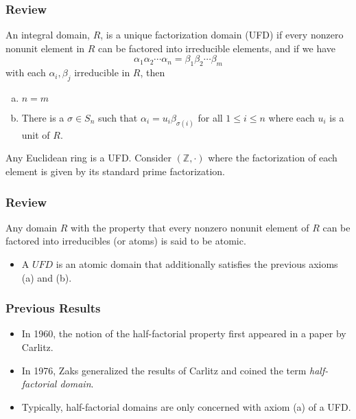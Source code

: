 \begin{frame}
  \frametitle{Review}
  \begin{definition}
    An integral domain, $R$, is a \alert{unique factorization domain (UFD)} if every nonzero nonunit element in $R$ can be factored into irreducible elements, and if we have
    $$ \alpha_1 \alpha_2 \cdots \alpha_n = \beta_1 \beta_2 \cdots \beta_m $$
    with each $\alpha_i, \beta_j$ irreducible in $R$, then
    \begin{enumerate}[(a)]
      \item $n = m$
      \item There is a $\sigma \in S_n$ such that $\alpha_i = u_i \beta_{\sigma(i)}$ for all $1 \leq i \leq n$ where each $u_i$ is a unit of $R$.
    \end{enumerate}
  \end{definition}
\end{frame}
\begin{frame}
  \begin{example}
    Any Euclidean ring is a UFD.
    Consider $(\mathbb{Z}, \cdot)$ where the factorization of each element is given by its standard prime factorization.
  \end{example}
\end{frame}

\begin{frame}
  \frametitle{Review}
  \begin{definition}
    Any domain $R$ with the property that every nonzero nonunit element of $R$ can be factored into irreducibles (or atoms) is said to be \alert{atomic}.
  \end{definition}
  \pause
  \begin{itemize}
    \item A $UFD$ is an atomic domain that additionally satisfies the previous axioms (a) and (b).
  \end{itemize}
\end{frame}

\begin{frame}
  \frametitle{Previous Results}
  \begin{itemize}
    \item<1-> In 1960, the notion of the half-factorial property first appeared in a paper by Carlitz.
    \item<2-> In 1976, Zaks generalized the results of Carlitz and coined the term \emph{half-factorial domain}.
    \item<3-> Typically, half-factorial domains are only concerned with axiom (a) of a UFD.
  \end{itemize}
\end{frame}

